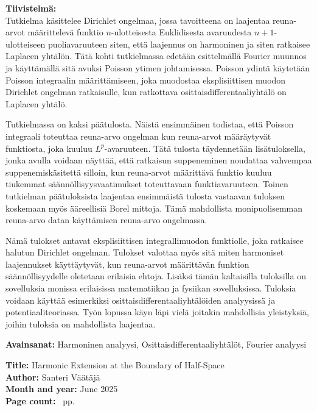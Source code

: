 \documentclass[a4paper, 11pt]{report}
\theoremstyle{plain}
\theoremstyle{definition}
\theoremstyle{remark}
\begin{document}
\noindent\textbf{Tiivistelmä:}\\ %
Tutkielma käsittelee Dirichlet ongelmaa, jossa tavoitteena on laajentaa reuna-arvot määrittelevä funktio $n$-ulotteisesta Euklidisesta avaruudesta $n+1$-ulotteiseen puoliavaruuteen siten, että laajennus on harmoninen ja siten ratkaisee Laplacen yhtälön. Tätä kohti tutkielmassa edetään esittelmällä Fourier muunnos ja käyttämällä sitä avuksi Poisson ytimen johtamisessa. Poisson ydintä käytetään Poisson integraalin määrittämiseen, joka muodostaa eksplisiittisen muodon Dirichlet ongelman ratkaisulle, kun ratkottava osittaisdifferentaaliyhtälö on Laplacen yhtälö.

Tutkielmassa on kaksi päätulosta. Näistä ensimmäinen todistaa, että Poisson integraali toteuttaa reuna-arvo ongelman kun reuna-arvot määräytyvät funktiosta, joka kuuluu $L^p$-avaruuteen. Tätä tulosta täydennetään lisätuloksella, jonka avulla voidaan näyttää, että ratkaisun suppeneminen noudattaa vahvempaa suppenemiskäsitettä silloin, kun reuna-arvot määrittävä funktio kuuluu tiukemmat säännöllisyysvaatimukset toteuttavaan funktiavaruuteen. Toinen tutkielman päätuloksista laajentaa ensimmäistä tulosta vastaavan tuloksen koskemaan myös ääreellisiä Borel mittoja. Tämä mahdollista monipuolisemman reuna-arvo datan käyttämisen reuna-arvo ongelmassa.

Nämä tulokset antavat eksplisiittisen integrallimuodon funktiolle, joka ratkaisee halutun Dirichlet ongelman. Tulokset valottaa myös sitä miten harmoniset laajennukset käyttäytyvät, kun reuna-arvot määrittävän funktion säännöllisyydelle oletetaan erilaisia ehtoja. Lisäksi tämän kaltaisilla tuloksilla on sovelluksia monissa erilaisissa matematiikan ja fysiikan sovelluksissa. Tuloksia voidaan käyttää esimerkiksi osittaisdifferentaaliyhtälöiden analyysissä ja potentiaaliteoriassa. Työn lopussa käyn läpi vielä joitakin mahdollisia yleistyksiä, joihin tuloksia on mahdollista laajentaa.

\vfill

\noindent\textbf{Avainsanat:} Harmoninen analyysi, Osittaisdifferentaaliyhtälöt, Fourier analyysi %

\clearpage
\noindent\textbf{Title:} Harmonic Extension at the Boundary of Half-Space\\ %
\textbf{Author:} Santeri Väätäjä\\ %
\textbf{Month and year:} June 2025\\ %
\textbf{Page count:} \pageref*{LastPage}~pp.\\[1em] %
\end{document}
